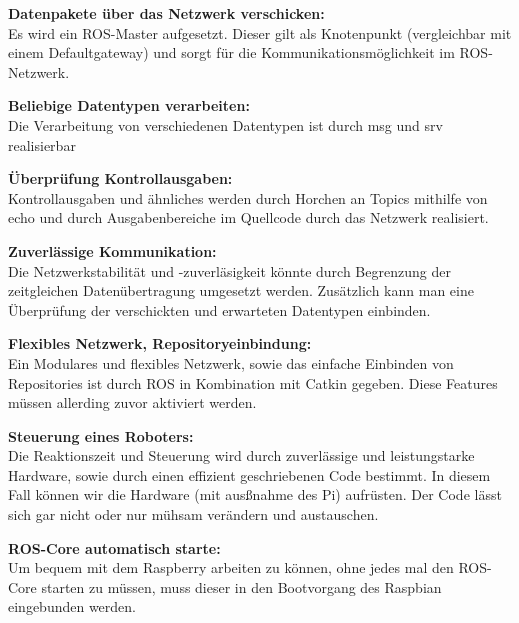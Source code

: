 \documentclass[12pt]{article}
\begin{document}
{\bf Datenpakete über das Netzwerk verschicken:}\\
Es wird ein ROS-Master aufgesetzt. Dieser gilt als Knotenpunkt (vergleichbar mit einem Defaultgateway) und sorgt für die Kommunikationsmöglichkeit im ROS-Netzwerk.

{\bf Beliebige Datentypen verarbeiten:}\\
Die Verarbeitung von verschiedenen Datentypen ist durch msg und srv realisierbar

{\bf Überprüfung Kontrollausgaben:}\\
Kontrollausgaben und ähnliches werden durch Horchen an Topics mithilfe von echo und durch Ausgabenbereiche im Quellcode durch das Netzwerk realisiert.
 

{\bf Zuverlässige Kommunikation:}\\
Die Netzwerkstabilität und -zuverläsigkeit könnte durch Begrenzung der zeitgleichen Datenübertragung umgesetzt werden. Zusätzlich kann man eine Überprüfung der verschickten und erwarteten Datentypen einbinden.


{\bf Flexibles Netzwerk, Repositoryeinbindung:}\\
Ein Modulares und flexibles Netzwerk, sowie das einfache Einbinden von Repositories ist durch ROS in Kombination mit Catkin gegeben. Diese Features müssen allerding zuvor aktiviert werden.

\vspace {0,6cm}

{\bf Steuerung eines Roboters:}\\
Die Reaktionszeit und Steuerung wird durch zuverlässige und leistungstarke Hardware, sowie durch einen effizient geschriebenen Code bestimmt. In diesem Fall können wir die Hardware (mit ausßnahme des Pi) aufrüsten. Der Code lässt sich gar nicht oder nur mühsam verändern und austauschen.

{\bf ROS-Core automatisch starte:}\\
Um bequem mit dem Raspberry arbeiten zu können, ohne jedes mal den ROS-Core starten zu müssen, muss dieser in den Bootvorgang des Raspbian eingebunden werden.
\end{document}
